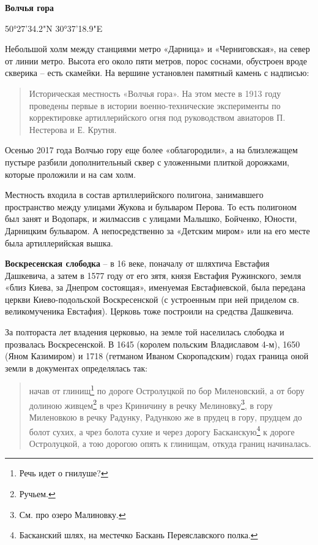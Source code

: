 \medskip

\textbf{Волчья гора} 

50°27'34.2"N 30°37'18.9"E

Небольшой холм между станциями метро «Дарница» и «Черниговская», на север от линии метро. Высота его около пяти метров, порос соснами, обустроен вроде скверика – есть скамейки. На вершине установлен памятный камень с надписью: 

\begin{quotation}
Историческая местность «Волчья гора». На этом месте в 1913 году проведены первые в истории военно-техни\-ческие эксперименты по корректировке артиллерийского огня под руководством авиаторов П. Нестерова и Е. Крутня.
\end{quotation}

Осенью 2017 года Волчью гору еще более «облагородили», а на близлежащем пустыре разбили дополнительный сквер с уложенными плиткой дорожками, которые проложили и на сам холм.

Местность входила в состав артиллерийского полигона, занимавшего пространство между улицами Жукова и бульваром Перова. То есть  полигоном был занят и Водопарк, и жилмассив с улицами Малышко, Бойченко, Юности, Дарницким бульваром. А непосредственно за «Детским миром» или на его месте была артиллерийская вышка.\\

\medskip


\textbf{Воскресенская слободка} – в 16 веке, поначалу от шляхтича Евстафия Дашкевича, а затем в 1577 году от его зятя, князя Евстафия Ружинского, земля «близ Киева, за Днепром состоящая», именуемая Евстафиевской, была передана церкви Киево-подольской Воскресенской (с устроенным при ней приделом св. великомученика Евстафия). Церковь тоже построили на средства Дашкевича.

За полтораста лет владения церковью, на земле той населилась слободка и прозвалась Воскресенской. В 1645 (королем польским Владиславом 4-м), 1650 (Яном Казимиром) и 1718 (гетманом Иваном Скоропадским) годах граница оной земли в документах определялась так:

\begin{quotation}
начав от глинищ\footnote{Речь идет о гнилуше?} по дороге Остролуцкой по бор Миленовский, а от бору долиною живцем\footnote{Ручьем.} в чрез Криничину в речку Мелиновку\footnote{См. про озеро Малиновку.}, в гору Миленовкою в речку Радунку, Радункою же в прудец в гору, прудцем до болот сухих, а чрез болота сухие и через дорогу Басканскую\footnote{Басканский шлях, на местечко Баскань Переяславского полка.} к дороге Остролуцкой, а тою дорогою опять к глинищам, откуда границ начиналась.
\end{quotation}

